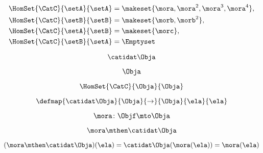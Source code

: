 \begin{forslides}
        
               \begin{equation}
            \label{eq:semicats-slides-85}
            \begin{aligned}
            \HomSet{\CatC}{\setA}{\setA} & = \makeset{ \mora, \mora^2, \mora^3, \mora^4 }, \\
            \HomSet{\CatC}{\setB}{\setB} & =  \makeset{ \morb, \morb^2 }, \\
            \HomSet{\CatC}{\setA}{\setB} & =  \makeset{ \morc }, \\
            \HomSet{\CatC}{\setB}{\setA} & = \Emptyset
        \end{aligned}
        \end{equation}
        
        
         \begin{equation}
            \label{eq:semicats-slides-86}
            \catidat\Obja
        \end{equation}
        
        
         \begin{equation}
            \label{eq:semicats-slides-87}
            \Obja
        \end{equation}
        
        
         \begin{equation}
            \label{eq:semicats-slides-88}
            \HomSet{\CatC}{\Obja}{\Obja}
        \end{equation}
        
        
         \begin{equation}
            \label{eq:semicats-slides-89}
            \defmap{
            \catidat\Obja
        }{
            \Obja
        }{
            \to
        }{
            \Obja
        }{
            \ela
        }{
            \ela
        }
        \end{equation}
        
        
         \begin{equation}
            \label{eq:semicats-slides-90}
            \mora \colon \Objf \mto \Obja
        \end{equation}
        
        
         \begin{equation}
            \label{eq:semicats-slides-91}
            \mora \mthen \catidat\Obja
        \end{equation}
        
        
         \begin{equation}
            \label{eq:semicats-slides-92}
            (\mora \mthen \catidat\Obja)(\ela)
        = \catidat\Obja(\mora (\ela)) = \mora (\ela)
        \end{equation}
        

\end{forslides}
